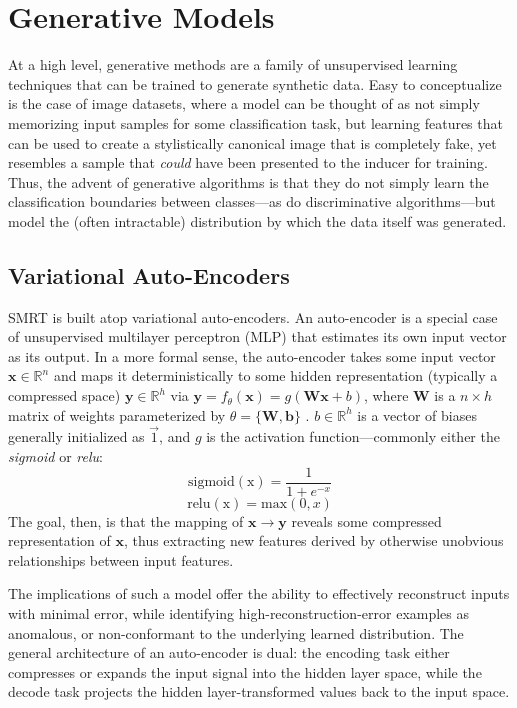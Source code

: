 \documentclass[twoside,11pt]{article}
\begin{document}
\section{Generative Models}

At a high level, generative methods are a family of unsupervised learning techniques that can be trained to generate synthetic data. Easy to conceptualize is the case of image datasets, where a model can be thought of as not simply memorizing input samples for some classification task, but learning features that can be used to create a stylistically canonical image that is completely fake, yet resembles a sample that \emph{could} have been presented to the inducer for training. Thus, the advent of generative algorithms is that they do not simply learn the classification boundaries between classes---as do discriminative algorithms---but model the (often intractable) distribution by which the data itself was generated.

\subsection{Variational Auto-Encoders}

SMRT is built atop variational auto-encoders. An auto-encoder is a special case of unsupervised multilayer perceptron (MLP) that estimates its own input vector as its output. In a more formal sense, the auto-encoder takes some input vector $\mathbf{x} \in  \mathbb{R}^{n}$ and maps it deterministically to some hidden representation (typically a compressed space) $\mathbf{y} \in  \mathbb{R}^{h}$ via $\mathbf{y} = f_{\theta}(\mathbf{x}) = g(\mathbf{Wx} + b)$, where $\mathbf{W}$ is a $n \times h$ matrix of weights parameterized by $\theta = \{\mathbf{W, b}\}$ \citep{meyer2015introduction}. $b \in \mathbb{R}^{h}$ is a vector of biases generally initialized as $\vec{1}$, and $g$ is the activation function---commonly either the \emph{sigmoid} or \emph{relu}:
\[
    \mathrm{sigmoid(x)} = \frac{1}{1 + e^{-x}}
\]
\[
    \mathrm{relu(x)} = \mathrm{max}(0,x)
\]
The goal, then, is that the mapping of $\mathbf{x} \rightarrow \mathbf{y}$ reveals some compressed representation of $\mathbf{x}$, thus extracting new features derived by otherwise unobvious relationships between input features.

The implications of such a model offer the ability to effectively reconstruct inputs with minimal error, while identifying high-reconstruction-error examples as anomalous, or non-conformant to the underlying learned distribution. The general architecture of an auto-encoder is dual: the encoding task either compresses or expands the input signal into the hidden layer space, while the decode task projects the hidden layer-transformed values back to the input space.
\end{document}
